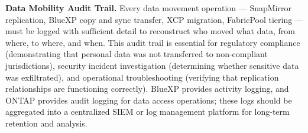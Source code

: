 \begin{securitybox}
\textbf{Data Mobility Audit Trail.}
Every data movement operation --- SnapMirror replication, BlueXP copy and sync
transfer, XCP migration, FabricPool tiering --- must be logged with sufficient
detail to reconstruct who moved what data, from where, to where, and when.
This audit trail is essential for regulatory compliance (demonstrating that
personal data was not transferred to non-compliant jurisdictions), security
incident investigation (determining whether sensitive data was exfiltrated),
and operational troubleshooting (verifying that replication relationships are
functioning correctly). BlueXP provides activity logging, and ONTAP provides
audit logging for data access operations; these logs should be aggregated into
a centralized SIEM or log management platform for long-term retention and
analysis.

\end{securitybox}
